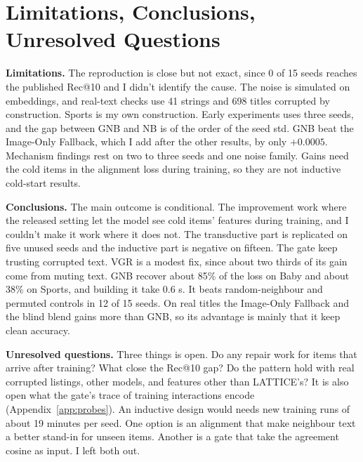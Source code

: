 \documentclass[conference]{IEEEtran}
\begin{document}
\section{Limitations, Conclusions, Unresolved Questions}

\textbf{Limitations.} The reproduction is close but not exact, since 0 of 15 seeds reaches the published Rec@10 and I didn't identify the cause. The noise is simulated on embeddings, and real-text checks use 41 strings and 698 titles corrupted by construction. Sports is my own construction. Early experiments uses three seeds, and the gap between GNB and NB is of the order of the seed std. GNB beat the Image-Only Fallback, which I add after the other results, by only $+0.0005$. Mechanism findings rest on two to three seeds and one noise family. Gains need the cold items in the alignment loss during training, so they are not inductive cold-start results.

\textbf{Conclusions.} The main outcome is conditional. The improvement work where the released setting let the model see cold items' features during training, and I couldn't make it work where it does not. The transductive part is replicated on five unused seeds and the inductive part is negative on fifteen. The gate keep trusting corrupted text. VGR is a modest fix, since about two thirds of its gain come from muting text. GNB recover about 85\% of the loss on Baby and about 38\% on Sports, and building it take 0.6 s. It beats random-neighbour and permuted controls in 12 of 15 seeds. On real titles the Image-Only Fallback and the blind blend gains more than GNB, so its advantage is mainly that it keep clean accuracy.

\textbf{Unresolved questions.} Three things is open. Do any repair work for items that arrive after training? What close the Rec@10 gap? Do the pattern hold with real corrupted listings, other models, and features other than LATTICE's? It is also open what the gate's trace of training interactions encode (Appendix~\ref{app:probes}). An inductive design would needs new training runs of about 19 minutes per seed. One option is an alignment that make neighbour text a better stand-in for unseen items. Another is a gate that take the agreement cosine as input. I left both out.
\end{document}
